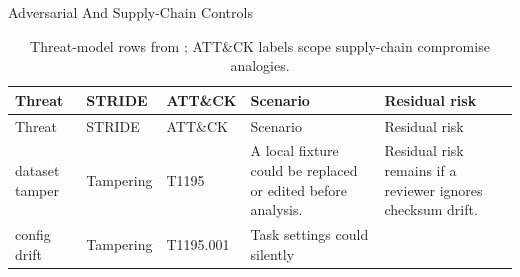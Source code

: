\documentclass[
  ignorenonframetext,
]{beamer}
\begin{document}
\begin{frame}{Adversarial And Supply-Chain
Controls}
\begin{longtable}[]{@{}
  >{\raggedright\arraybackslash}p{}
  >{\raggedright\arraybackslash}p{}
  >{\raggedright\arraybackslash}p{}
  >{\raggedright\arraybackslash}p{}
  >{\raggedright\arraybackslash}p{}@{}}
\caption{Threat-model rows from
\protect{}; ATT\&CK
labels scope supply-chain compromise
analogies.}\label{tbl:security-threat-model}\tabularnewline
\toprule\noalign{}
\begin{minipage}[b]{\linewidth}\raggedright
Threat
\end{minipage} & \begin{minipage}[b]{\linewidth}\raggedright
STRIDE
\end{minipage} & \begin{minipage}[b]{\linewidth}\raggedright
ATT\&CK
\end{minipage} & \begin{minipage}[b]{\linewidth}\raggedright
Scenario
\end{minipage} & \begin{minipage}[b]{\linewidth}\raggedright
Residual risk
\end{minipage} \\
\midrule\noalign{}
\endfirsthead
\toprule\noalign{}
\begin{minipage}[b]{\linewidth}\raggedright
Threat
\end{minipage} & \begin{minipage}[b]{\linewidth}\raggedright
STRIDE
\end{minipage} & \begin{minipage}[b]{\linewidth}\raggedright
ATT\&CK
\end{minipage} & \begin{minipage}[b]{\linewidth}\raggedright
Scenario
\end{minipage} & \begin{minipage}[b]{\linewidth}\raggedright
Residual risk
\end{minipage} \\
\midrule\noalign{}
\endhead
dataset tamper & Tampering & T1195 & A local fixture could be replaced
or edited before analysis. & Residual risk remains if a reviewer ignores
checksum drift. \\
config drift & Tampering & T1195.001 & Task settings could silently

\end{longtable}
\end{frame}
\end{document}
